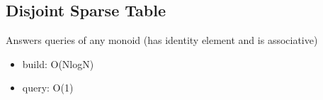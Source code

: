 \subsection{Disjoint Sparse Table}
Answers queries of any monoid (has identity element and is associative)

\begin{itemize}
  \item build: O(NlogN)
  \item query: O(1)
\end{itemize}
